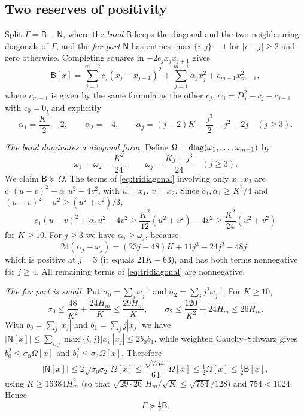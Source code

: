 \documentclass[11pt]{article}
\numberwithin{equation}{section}
\theoremstyle{definition}\newtheorem{definition}[theorem]{Definition}
\theoremstyle{remark}\newtheorem{remark}[theorem]{Remark}
\begin{document}
\subsection{Two reserves of positivity}\label{sec:app-reserves}

Split $\Gamma=\mathsf B-\mathsf N$, where the \emph{band} $\mathsf B$
keeps the diagonal and the two neighbouring diagonals of $\Gamma$, and the
\emph{far part} $\mathsf N$ has entries $\max\{i,j\}-1$ for $|i-j|\ge2$
and zero otherwise. Completing squares in $-2c_jx_jx_{j+1}$ gives
\begin{equation}\label{eq:tridiagonal}
 \mathsf B[x]=\sum_{j=1}^{m-2}c_j(x_j-x_{j+1})^2
              +\sum_{j=1}^{m-1}\alpha_jx_j^2+c_{m-1}x_{m-1}^2,
\end{equation}
where $c_{m-1}$ is given by the same formula as the other $c_j$,
$\alpha_j=D_j^2-c_j-c_{j-1}$ with $c_0=0$, and explicitly
\[
 \alpha_1=\frac{K^2}2-2,\qquad \alpha_2=-4,\qquad
 \alpha_j=(j-2)K+\frac{j^3}2-j^2-2j\quad(j\ge3).
\]

\emph{The band dominates a diagonal form.} Define
$\Omega=\operatorname{diag}(\omega_1,\dots,\omega_{m-1})$ by
\[
 \omega_1=\omega_2=\frac{K^2}{24},\qquad \omega_j=\frac{Kj+j^3}{24}\quad(j\ge3).
\]
We claim $\mathsf B\succeq\Omega$. The terms of \eqref{eq:tridiagonal}
involving only $x_1,x_2$ are $c_1(u-v)^2+\alpha_1u^2-4v^2$, with
$u=x_1$, $v=x_2$. Since $c_1,\alpha_1\ge K^2/4$ and
$(u-v)^2+u^2\ge(u^2+v^2)/3$,
\[
 c_1(u-v)^2+\alpha_1u^2-4v^2
 \ge\frac{K^2}{12}(u^2+v^2)-4v^2
 \ge\frac{K^2}{24}(u^2+v^2)
\]
for $K\ge10$. For $j\ge3$ we have $\alpha_j\ge\omega_j$, because
\[
 24(\alpha_j-\omega_j)=(23j-48)K+11j^3-24j^2-48j,
\]
which is positive at $j=3$ (it equals $21K-63$), and has both terms
nonnegative for $j\ge4$. All remaining terms of \eqref{eq:tridiagonal}
are nonnegative.

\emph{The far part is small.} Put $\sigma_0=\sum_j\omega_j^{-1}$ and
$\sigma_2=\sum_jj^2\omega_j^{-1}$. For $K\ge10$,
\[
 \sigma_0\le\frac{48}{K^2}+\frac{24H_m}{K}\le\frac{29H_m}{K},
 \qquad
 \sigma_2\le\frac{120}{K^2}+24H_m\le26H_m.
\]
With $b_0=\sum_j|x_j|$ and $b_1=\sum_jj|x_j|$ we have
$|\mathsf N[x]|\le\sum_{i,j}\max\{i,j\}|x_i||x_j|\le2b_0b_1$, while
weighted Cauchy--Schwarz gives $b_0^2\le\sigma_0\Omega[x]$ and
$b_1^2\le\sigma_2\Omega[x]$. Therefore
\begin{equation}\label{eq:remainder}
 |\mathsf N[x]|
 \le2\sqrt{\sigma_0\sigma_2}\,\Omega[x]
 \le\frac{\sqrt{754}}{64}\,\Omega[x]
 \le\tfrac12\Omega[x]\le\tfrac12\mathsf B[x],
\end{equation}
using $K\ge16384H_m^2$ (so that $\sqrt{29\cdot26}\,H_m/\sqrt K\le\sqrt{754}/128$)
and $754<1024$. Hence
\[
 \Gamma\succeq\tfrac12\mathsf B.
\]
\end{document}
